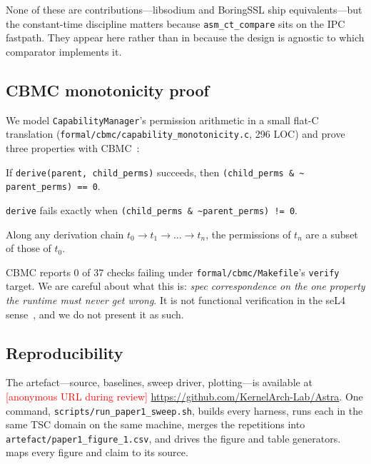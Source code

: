 None of these are contributions---libsodium and BoringSSL ship
equivalents---but the constant-time discipline matters because
\texttt{asm\_ct\_compare} sits on the IPC fastpath. They appear here
rather than in  because the design is agnostic to
which comparator implements it.

\subsection{CBMC monotonicity proof}
\label{sec:impl:cbmc}

We model \texttt{CapabilityManager}'s permission arithmetic in a
small flat-C translation
(\texttt{formal/cbmc/capability\_monotonicity.c}, 296 LOC) and prove
three properties with CBMC~\cite{cbmc}:

\begin{description}
\itemsep0pt
\item[Subset-on-success] If \texttt{derive(parent, child\_perms)}
succeeds, then \texttt{(child\_perms \& \textasciitilde
parent\_perms) == 0}.
\item[Rejection-bijection] \texttt{derive} fails exactly when
\texttt{(child\_perms \& \textasciitilde parent\_perms) != 0}.
\item[No-recovery-through-chain] Along any derivation chain
$t_0 \to t_1 \to \dots \to t_n$, the permissions of $t_n$ are a
subset of those of $t_0$.
\end{description}

CBMC reports 0 of 37 checks failing under
\texttt{formal/cbmc/Makefile}'s \texttt{verify} target. We are
careful about what this is: \textit{spec correspondence on the one
property the runtime must never get wrong}. It is not functional
verification in the seL4 sense~\cite{klein2009sel4}, and we do not
present it as such.

\subsection{Reproducibility}
\label{sec:impl:repro}

The artefact---source, baselines, sweep driver, plotting---is
available at \ifanon\textcolor{red}{[anonymous URL during review]}\else
\url{https://github.com/KernelArch-Lab/Astra}\fi.
One command, \texttt{scripts/run\_paper1\_sweep.sh}, builds every
harness, runs each in the same TSC domain on the same machine,
merges the repetitions into \texttt{artefact/paper1\_figure\_1.csv},
and drives the figure and table generators.
 maps every figure and claim to its source.

